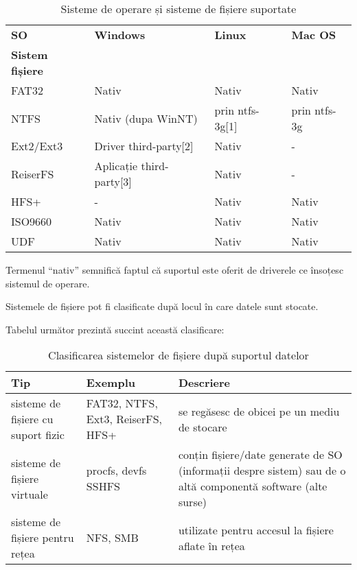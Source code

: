 \begin{table}[htb]
\caption{Sisteme de operare și sisteme de fișiere suportate}
\begin{center}
	\begin{tabular}{ p{} p{} p{} p{} }
	\toprule
		\textbf{SO} & \textbf{Windows} & \textbf{Linux} & \textbf{Mac OS} \\
		\textbf{Sistem fișiere} & & & \\
	\midrule
		FAT32 & Nativ & Nativ & Nativ \\
	\midrule
		NTFS & Nativ (dupa WinNT) & prin ntfs-3g[1] & prin ntfs-3g \\
	\midrule
		Ext2/Ext3 & Driver third-party[2] & Nativ & - \\
	\midrule
		ReiserFS & Aplicație third-party[3] & Nativ & - \\
	\midrule
		HFS+ & - & Nativ & Nativ \\
	\midrule
		ISO9660 & Nativ & Nativ & Nativ \\
	\midrule
		UDF & Nativ & Nativ & Nativ \\
	\bottomrule
	\end{tabular}
	\label{table:file-system-backup-fs-types}
\end{center}
\end{table}

Termenul “nativ” semnifică faptul că suportul este oferit de driverele ce
însoțesc sistemul de operare.

Sistemele de fișiere pot fi clasificate după locul în care datele sunt stocate.

Tabelul următor prezintă succint această clasificare:

\begin{table}[htb]
\caption{Clasificarea sistemelor de fișiere după suportul datelor}
\begin{center}
	\begin{tabular}{ p{} p{} p{} }
	\toprule
		\textbf{Tip} & \textbf{Exemplu} & \textbf{Descriere} \\
	\midrule
		sisteme de fișiere cu suport fizic & 	FAT32, NTFS, Ext3, ReiserFS, HFS+ & se
		regăsesc de obicei pe un mediu de stocare \\
	\midrule
		sisteme de fișiere virtuale & 	procfs, devfs SSHFS & conțin fișiere/date generate
		de SO (informații despre sistem) sau de o altă componentă software (alte surse) \\
	\midrule
		sisteme de fișiere pentru rețea & 	NFS, SMB & utilizate pentru accesul la
		fișiere aflate în rețea \\
	\bottomrule
	\end{tabular}
	\label{table:file-system-fs-classes}
\end{center}
\end{table}

